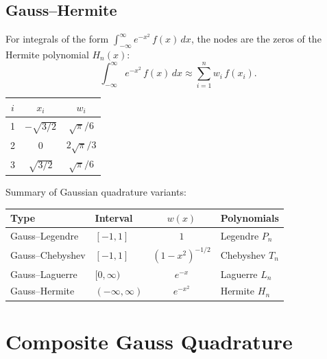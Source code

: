 \subsection{Gauss--Hermite}

\begin{definition}
\label{def:gauss-hermite}
For integrals of the form $\int_{-\infty}^{\infty} e^{-x^2}\,f(x)\,dx$, the nodes are the zeros of the Hermite polynomial $H_n(x)$:
\[
    \int_{-\infty}^{\infty} e^{-x^2}\,f(x)\,dx \approx \sum_{i=1}^{n} w_i\,f(x_i).
\]
\end{definition}

\begin{example}[Gauss--Hermite nodes and weights ($n=3$)]
\begin{center}
\begin{tabular}{ccc}
    \toprule
    $i$ & $x_i$ & $w_i$ \\
    \midrule
    1 & $-\sqrt{3/2}$ & $\sqrt{\pi}/6$ \\
    2 & $0$           & $2\sqrt{\pi}/3$ \\
    3 & $\sqrt{3/2}$  & $\sqrt{\pi}/6$ \\
    \bottomrule
\end{tabular}
\end{center}
\end{example}

\begin{remark}
Summary of Gaussian quadrature variants:
\begin{center}
\begin{tabular}{llcl}
    \toprule
    \textbf{Type} & \textbf{Interval} & $w(x)$ & \textbf{Polynomials} \\
    \midrule
    Gauss--Legendre  & $[-1,1]$            & $1$          & Legendre $P_n$ \\
    Gauss--Chebyshev & $[-1,1]$            & $(1-x^2)^{-1/2}$ & Chebyshev $T_n$ \\
    Gauss--Laguerre  & $[0,\infty)$        & $e^{-x}$     & Laguerre $L_n$ \\
    Gauss--Hermite   & $(-\infty,\infty)$  & $e^{-x^2}$   & Hermite $H_n$ \\
    \bottomrule
\end{tabular}
\end{center}
\end{remark}

\section{Composite Gauss Quadrature}

